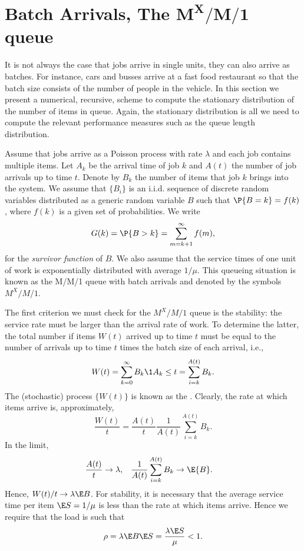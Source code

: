 \section
[Batch Arrivals, The $M^X/M/1$ queue]
{Batch Arrivals, The $\mathbf{M^X/M/1}$ queue}
\label{sec:batch-arrivals}

It is not always the case that jobs arrive in single units, they can
also arrive as batches. For instance, cars and busses arrive at a fast
food restaurant so that the batch size consists of the number of
people in the vehicle.  In this section we present a numerical,
recursive, scheme to compute the stationary distribution of the number
of items in queue. Again, the stationary distribution is all we need
to compute the relevant performance measures such as the queue
length distribution.


Assume that jobs arrive as a Poisson process with rate $\lambda$ and
each job contains multiple items.  Let $A_k$ be the arrival time of
job $k$ and $A(t)$ the number of job arrivals up to time $t$. Denote
by $B_k$ the number of items that job $k$ brings into the system.  We
assume that $\{B_i\}$ is an i.i.d. sequence of discrete random
variables distributed as a generic random variable $B$ such that
$\P{B = k} = f(k)$, where $f(k)$ is a given set of probabilities. We
write
\begin{equation*}
  G(k) = \P{B>k} = \sum_{m=k+1}^\infty f(m),
\end{equation*}
for the \emph{survivor function} of $B$.
We also assume that the service times of one unit
of work is exponentially distributed with average $1/\mu$. This
queueing situation is known as the M/M/1 queue with batch arrivals and
denoted by the symbols $M^X/M/1$.

The first criterion we must check for the $M^X/M/1$ queue is the
stability: the service rate must be larger than the arrival rate of
work. To determine the latter, the total number if items $W(t)$
arrived up to time $t$ must be equal to the number of arrivals up to
time $t$ times the batch size of each arrival, i.e.,
\begin{equation*}
W(t)=  \sum_{k=0}^\infty B_k \1{A_k \leq t} = \sum_{i=k}^{A(t)} B_k.
\end{equation*}
The (stochastic) process $\{W(t)\}$ is known as the . Clearly, the rate at which items arrive is,
approximately,
\begin{equation*}
  \frac{W(t)}t = \frac{A(t)}t \frac1{A(t)}\sum_{i=k}^{A(t)} B_k.
\end{equation*}
In the limit, 
\begin{align*}
  \frac{A(t)}t &\to \lambda,  & \frac1{A(t)}\sum_{i=k}^{A(t)} B_k &\to \E{B}.
\end{align*}
Hence, $W(t)/t \to \lambda \E B$. For stability, it is necessary that
the average service time per item $\E S=1/\mu$ is less than the rate at which items arrive. Hence we require that  the load is such that
\begin{equation*}
\rho = \lambda \E B \E S = \frac{\lambda \E S} \mu < 1.
\end{equation*}


